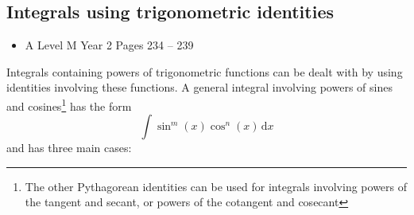 \documentclass[11pt, a4paper]{article}
\begin{document}
\subsection{Integrals using trigonometric identities}
\begin{itemize}
\item A Level M Year 2 \hspace{1cm} \phantom{ AS / } Pages 234 -- 239
\end{itemize}
Integrals containing powers of trigonometric functions can be dealt with by using identities involving these functions. A general integral involving powers of sines and cosines\footnote{The other Pythagorean identities can be used for integrals involving powers of the tangent and secant, or powers of the cotangent and cosecant} has the form
\begin{equation*}
\int \sin^{m}(x)\cos^{n}(x)\,\mathrm{d}x
\end{equation*}
and has three main cases:
\end{document}
